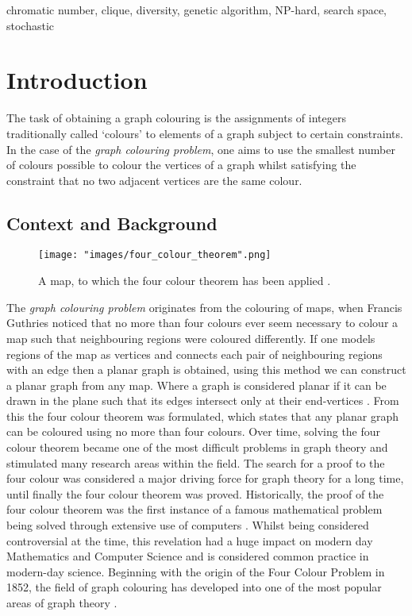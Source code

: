 \documentclass[12pt,a4paper]{article}
\begin{document}
\begin{keywords}
chromatic number, clique, diversity,  genetic algorithm, NP-hard, search space, stochastic 
\end{keywords}


\section{Introduction}
\par The task of obtaining a graph colouring is the assignments of integers traditionally called `colours' to elements of a graph subject to certain constraints. In the case of the \textit{graph colouring problem}, one aims to use the smallest number of colours possible to colour the vertices of a graph whilst satisfying the constraint that no two adjacent vertices are the same colour.
\subsection*{Context and Background}
\begin{wrapfigure}{h}{0.35\textwidth}
\texttt{[image: "images/four\_colour\_theorem".png]}
\caption{A map, to which the four colour theorem has been applied \cite{Wiki}.}
\vspace*{-0.25cm}
\label{fig:four_colour}
\end{wrapfigure}
\par The \textit{graph colouring problem} originates from the colouring of maps, when Francis Guthries noticed that no more than four colours ever seem necessary to colour a map such that neighbouring regions were coloured differently. If one models regions of the map as vertices and connects each pair of neighbouring regions with an edge then a planar graph is obtained, using this method we can construct a planar graph from any map. Where a graph is considered planar if it can be drawn in the plane such that its edges intersect only at their end-vertices \cite{Trudeau}. From this the four colour theorem was formulated, which states that any planar graph can be coloured using no more than four colours. Over time, solving the four colour theorem became one of the most difficult problems in graph theory and stimulated many research areas within the field. The search for a proof to the four colour was considered a major driving force for graph theory for a long time, until finally the four colour theorem was proved. Historically, the proof of the four colour theorem was the first instance of a famous mathematical problem being solved through extensive use of computers \cite{Appel}. Whilst being considered controversial at the time, this revelation had a huge impact on modern day Mathematics and Computer Science and is considered common practice in modern-day science.  Beginning with the origin of the Four Colour Problem in 1852, the field of graph colouring has developed into one of the most popular areas of graph theory \cite{Zhang}.
\end{document}
